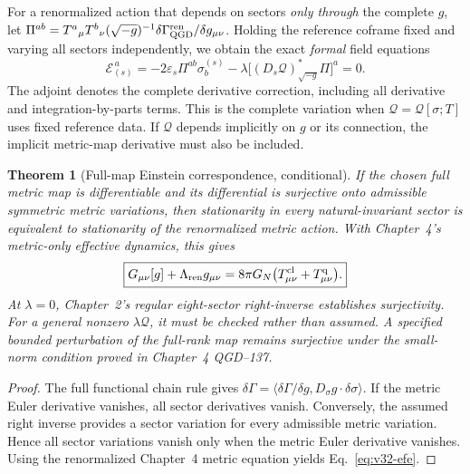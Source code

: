 \documentclass[11pt,a4paper]{article}
\newtheorem{theorem}{Theorem}[section]
\theoremstyle{remark}\newtheorem{remark}[theorem]{Remark}
\begin{document}
For a renormalized action that depends on sectors \emph{only through}
the complete $g$, let
$\Pi^{ab}=T^a{}_{\mu}T^b{}_{\nu}
(\sqrt{-g})^{-1}\delta\Gamma_{\rm QGD}^{\rm ren}/\delta g_{\mu\nu}$.
Holding the reference coframe fixed and varying all sectors
independently, we obtain the exact \emph{formal} field equations
\begin{equation}\label{eq:v32-euler}
\boxed{\mathscr E_{(s)}^{\,a}
=-2\varepsilon_s\Pi^{ab}\sigma_b^{(s)}
-\lambda\big[(D_s\mathcal Q)^*_{\sqrt{-g}}\Pi\big]^a=0.}
\end{equation}
The adjoint denotes the complete derivative correction, including
all derivative and integration-by-parts terms. This is the complete
variation when $\mathcal Q=\mathcal Q[\sigma;T]$ uses fixed reference
data. If $\mathcal Q$ depends implicitly on $g$ or its connection,
the implicit metric-map derivative must also be included.

\begin{theorem}[Full-map Einstein correspondence, conditional]
\label{thm:v32-correspondence}
If the chosen full metric map is differentiable and its differential
is surjective onto admissible symmetric metric variations, then
stationarity in every natural-invariant sector is equivalent to
stationarity of the renormalized metric action. With Chapter~4's
metric-only effective dynamics, this gives
\begin{equation}\label{eq:v32-efe}
\boxed{G_{\mu\nu}[g]+\Lambda_{\rm ren}g_{\mu\nu}
=8\pi G_N\bigl(T_{\mu\nu}^{\rm cl}+T_{\mu\nu}^{\rm q}\bigr).}
\end{equation}
At $\lambda=0$, Chapter~2's regular eight-sector right-inverse
establishes surjectivity. For a general nonzero $\lambda\mathcal Q$,
it must be checked rather than assumed. A specified bounded
perturbation of the full-rank map remains surjective under the
small-norm condition proved in Chapter~4 QGD--137.
\end{theorem}
\begin{proof}
The full functional chain rule gives
$\delta\Gamma=\langle\delta\Gamma/\delta g,
D_\sigma g\cdot\delta\sigma\rangle$.
If the metric Euler derivative vanishes, all sector derivatives
vanish. Conversely, the assumed right inverse provides a sector
variation for every admissible metric variation. Hence all sector
variations vanish only when the metric Euler derivative vanishes.
Using the renormalized Chapter~4 metric equation yields
Eq.~\eqref{eq:v32-efe}.
\end{proof}
\end{document}
